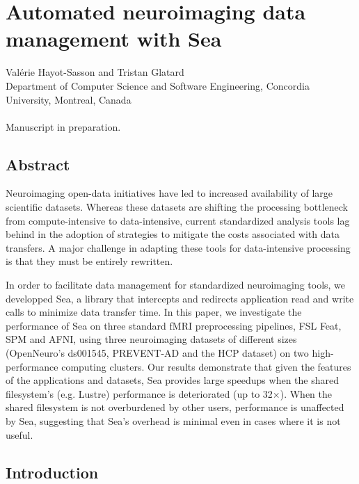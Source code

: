 \chapter{Automated neuroimaging data management with Sea}\label{chapter:sea-neuro}

Val\'erie Hayot-Sasson and Tristan Glatard \\
\begingroup \footnotesize
Department of Computer Science and Software Engineering, Concordia University, Montreal, Canada \\
\endgroup 
\vspace{5pt} \\
Manuscript in preparation. \\

\section{Abstract}

	Neuroimaging open-data initiatives have led to increased availability of large
  scientific datasets. Whereas these datasets are shifting the processing
  bottleneck from compute-intensive to data-intensive, current standardized
  analysis tools lag behind in the adoption of strategies to mitigate the costs
  associated with data transfers. A major challenge in adapting these tools for
  data-intensive processing is that they must be entirely rewritten.
  
  In order to facilitate data management for standardized neuroimaging tools, we
  developped Sea, a library that intercepts and redirects application read and
  write calls to minimize data transfer time. In this paper, we investigate the
  performance of Sea on three standard fMRI preprocessing pipelines, FSL Feat,
  SPM and AFNI, using three neuroimaging datasets of different sizes
  (OpenNeuro's ds001545, PREVENT-AD and the HCP dataset) on two high-performance
  computing clusters. Our results demonstrate that given the features of the
  applications and datasets, Sea provides large speedups when the shared
  filesystem's (e.g. Lustre) performance is deteriorated (up to 32$\times$).
  When the shared filesystem is not overburdened by other users, performance is
  unaffected by Sea, suggesting that Sea's overhead is minimal even in cases
  where it is not useful.
  
  \section{Introduction}\label{sec:sea_neuro:introduction}
    
